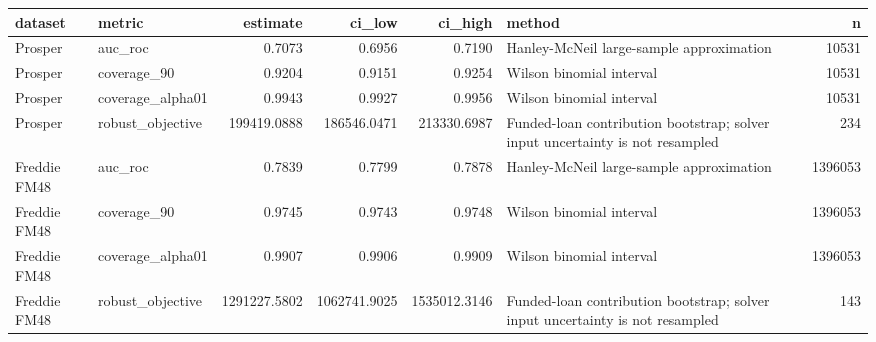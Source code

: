 \begin{tabular}{llrrrlr}
\toprule
dataset & metric & estimate & ci\_low & ci\_high & method & n \\
\midrule
Prosper & auc\_roc & 0.7073 & 0.6956 & 0.7190 & Hanley-McNeil large-sample approximation & 10531 \\
Prosper & coverage\_90 & 0.9204 & 0.9151 & 0.9254 & Wilson binomial interval & 10531 \\
Prosper & coverage\_alpha01 & 0.9943 & 0.9927 & 0.9956 & Wilson binomial interval & 10531 \\
Prosper & robust\_objective & 199419.0888 & 186546.0471 & 213330.6987 & Funded-loan contribution bootstrap; solver input uncertainty is not resampled & 234 \\
Freddie FM48 & auc\_roc & 0.7839 & 0.7799 & 0.7878 & Hanley-McNeil large-sample approximation & 1396053 \\
Freddie FM48 & coverage\_90 & 0.9745 & 0.9743 & 0.9748 & Wilson binomial interval & 1396053 \\
Freddie FM48 & coverage\_alpha01 & 0.9907 & 0.9906 & 0.9909 & Wilson binomial interval & 1396053 \\
Freddie FM48 & robust\_objective & 1291227.5802 & 1062741.9025 & 1535012.3146 & Funded-loan contribution bootstrap; solver input uncertainty is not resampled & 143 \\
\bottomrule
\end{tabular}
